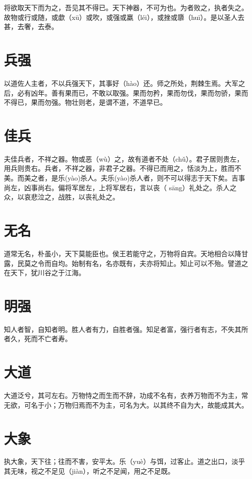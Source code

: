 \documentclass[a4paper,12pt,UTF8,twoside]{ctexbook}
\begin{document}
	将欲取天下而为之，吾见其不得已。天下神器，不可为也。为者败之，执者失之。故物或行或随，或歔（xū）或吹，或强或羸（léi），或挫或隳（huī）。是以圣人去甚，去奢，去泰。
	
	
	

	\chapter{兵强}
	以道佐人主者，不以兵强天下，其事好（hào）还。师之所处，荆棘生焉。大军之后，必有凶年。善有果而已，不敢以取强。果而勿矜，果而勿伐，果而勿骄，果而不得已，果而勿强。物壮则老，是谓不道，不道早已。	
	
	
	\chapter{佳兵}
	夫佳兵者，不祥之器。物或恶（wù）之，故有道者不处（chǔ）。君子居则贵左，用兵则贵右。兵者，不祥之器，非君子之器。不得已而用之，恬淡为上，胜而不美。而美之者，是乐(yào)杀人。夫乐(yào)杀人者，则不可以得志于天下矣。吉事尚左，凶事尚右。偏将军居左，上将军居右，言以丧（	sāng）礼处之。杀人之众，以哀悲泣之，战胜，以丧礼处之。	
	
	
	
	\chapter{无名}
	道常无名，朴虽小，天下莫能臣也。侯王若能守之，万物将自宾。天地相合以降甘露，民莫之令而自均。始制有名，名亦既有，夫亦将知止。知止可以不殆。譬道之在天下，犹川谷之于江海。
	
	
	
	\chapter{明强}
	
	知人者智，自知者明。胜人者有力，自胜者强。知足者富，强行者有志，不失其所者久，死而不亡者寿。
	
	
	
	\chapter{大道}
	
	大道泛兮，其可左右。万物恃之而生而不辞，功成不名有，衣养万物而不为主，常无欲，可名于小；万物归焉而不为主，可名为大。以其终不自为大，故能成其大。	
	
	
	\chapter{大象}
	执大象，天下往；往而不害，安平太。乐（yuè）与饵，过客止。道之出口，淡乎其无味，视之不足见（jiàn），听之不足闻，用之不足既。
	
\end{document}
